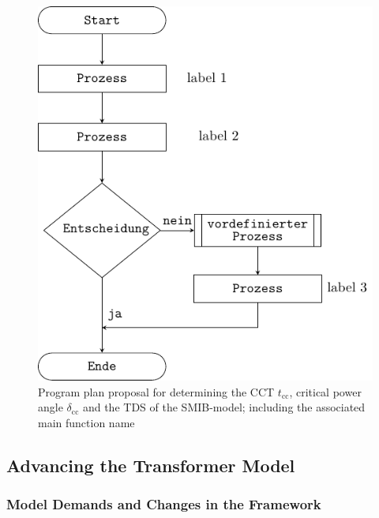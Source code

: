 \begin{figure}[h]
        \centering
        \includegraphics{tikz_graphics/images/programm.pdf}
        \caption[Program plan proposal for determining the \acf{CCT}]{Program plan proposal for determining the \acf{CCT} $t_\mathrm{cc}$, critical power angle $\delta_\mathrm{cc}$ and the \acf{TDS} of the \acf{SMIB}-model; including the associated main function name}
        \label{fig:program-plan}
\end{figure}


\subsection{Advancing the Transformer Model}


\subsubsection{Model Demands and Changes in the Framework}

